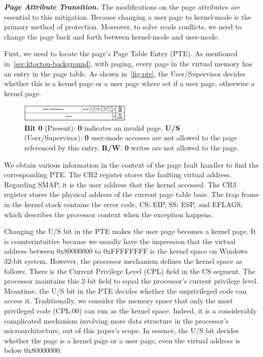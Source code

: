 \textbf{\textit{Page Attribute Transition.}}  The modifications on the page attributes are essential to this mitigation. Because changing a user page to kernel-mode is the primary method of protection.  Moreover, to solve reads conflicts, we need to change the page back and forth between kernel-mode and user-mode.

First, we need to locate the page's Page Table Entry (PTE). As mentioned in~\autoref{sec:ktoctou-background}, with paging, every page in the virtual memory has an entry in the page table.  As shown in~\autoref{fig:pte}, the User/Supervisor decides whether this is a kernel page or a user page where set if a user page, otherwise a kernel page.

\begin{figure}[th]
  \includegraphics[width=0.47\textwidth]{figures/pte2}
  \centering
  \caption{\textbf{Bit 0} (Present): \textbf{0} indicates an invalid page. \textbf{U/S} (User/Supervisor): \textbf{0} user-mode accesses are not allowed to the page referenced by this entry. \textbf{R/W}: \textbf{0} writes are not allowed to the page.}
  \label{fig:pte}
\end{figure}



We obtain various information in the context of the page fault handler to find the corresponding PTE. The CR2 register stores the faulting virtual address. Regarding SMAP, it is the user address that the kernel accessed. The CR3 register stores the physical address of the current page table base. The trap frame in the kernel stack contains the error code, CS: EIP, SS: ESP, and EFLAGS, which describes the processor context when the exception happens.

Changing the U/S bit in the PTE makes the user page becomes a kernel page. It is counterintuitive because we usually have the impression that the virtual address between 0x80000000 to 0xFFFFFFFF is the kernel space on Windows 32-bit system. However, the processor mechanism defines the kernel space as follows. There is the Current Privilege Level (CPL) field in the CS segment. The processor maintains this 2-bit field to equal the processor's current privilege level. Meantime, the U/S bit in the PTE decides whether the unprivileged code can access it. Traditionally, we consider the memory space that only the most privileged code (CPL:00) can run as the kernel space. Indeed, it is a considerably complicated mechanism involving more data structure in the processor's microarchitecture, out of this paper's scope. In essence, the U/S bit decides whether the page is a kernel page or a user page, even the virtual address is below 0x80000000.


